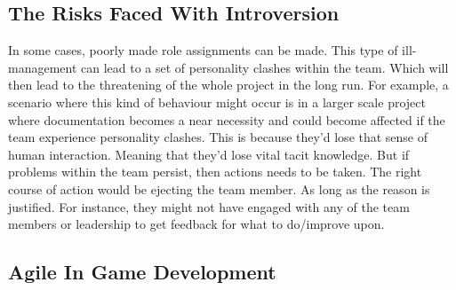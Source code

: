 \documentclass{scrartcl}
\begin{document}
    \subsection{The Risks Faced With Introversion}
    In some cases, poorly made role assignments can be made. This type of ill-management can lead to a set of personality clashes within the team. Which will then lead to the threatening of the whole project in the long run. For example, a scenario where this kind of behaviour might occur is in a larger scale project where documentation becomes a near necessity and could become affected if the team experience personality clashes. This is because they'd lose that sense of human interaction. Meaning that they'd lose vital tacit knowledge\cite{5071413}. But if problems within the team persist, then actions needs to be taken. The right course of action would be ejecting the team member. As long as the reason is justified. For instance, they might not have engaged with any of the team members or leadership to get feedback for what to do/improve upon.
    
    \subsection{Agile In Game Development}
    
    \newpage
    \newpage
    


\end{document}
